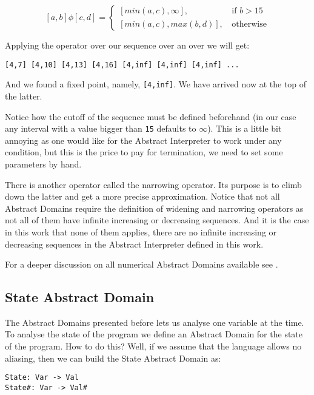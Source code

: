 \[[a, b] \phi [c, d] =
     \begin{cases}
       [min(a,c), \infty]\text{, } & \text{if } b > 15 \\
       [min(a,c), max(b,d)]\text{, } & \text{otherwise}
     \end{cases}\]

Applying the operator over our sequence over an over we will get:

\begin{verbatim}
[4,7] [4,10] [4,13] [4,16] [4,inf] [4,inf] [4,inf] ...
\end{verbatim}

And we found a fixed point, namely, \texttt{{[}4,inf{]}}. We have
arrived now at the top of the latter.

Notice how the cutoff of the sequence must be defined beforehand (in our
case any interval with a value bigger than \texttt{15} defaults to
\(\infty{}\)). This is a little bit annoying as one would like for the
Abstract Interpreter to work under any condition, but this is the price
to pay for termination, we need to set some parameters by hand.

There is another operator called the narrowing operator. Its purpose is
to climb down the latter and get a more precise approximation. Notice
that not all Abstract Domains require the definition of widening and
narrowing operators as not all of them have infinite increasing or
decreasing sequences. And it is the case in this work that none of them
applies, there are no infinite increasing or decreasing sequences in the
Abstract Interpreter defined in this work.

For a deeper discussion on all numerical Abstract Domains available see
\textcite{mine_weakly_2004}.

\subsection{State Abstract Domain}\label{state-abstract-domain}

The Abstract Domains presented before lets us analyse one variable at
the time. To analyse the state of the program we define an Abstract
Domain for the state of the program. How to do this? Well, if we assume
that the language allows no aliasing, then we can build the State
Abstract Domain as:

\begin{verbatim}
State: Var -> Val
State#: Var -> Val#
\end{verbatim}

